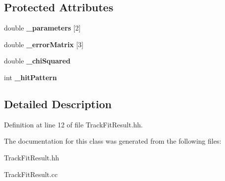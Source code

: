 \subsection*{Protected Attributes}
\begin{DoxyCompactItemize}
\item 
double {\bfseries \-\_\-parameters} [2]\label{classTBTrack_1_1TrackFitResult_ae9b05a73283ac5d325e9bf1a07658854}

\item 
double {\bfseries \-\_\-error\-Matrix} [3]\label{classTBTrack_1_1TrackFitResult_ac56f2127f056edc21a142686304b2acc}

\item 
double {\bfseries \-\_\-chi\-Squared}\label{classTBTrack_1_1TrackFitResult_acdb3c7423e9cb577feb311f30a8f31e7}

\item 
int {\bfseries \-\_\-hit\-Pattern}\label{classTBTrack_1_1TrackFitResult_a585ab993aa74efcb9a0852df862d2be4}

\end{DoxyCompactItemize}


\subsection{Detailed Description}


Definition at line 12 of file Track\-Fit\-Result.\-hh.



The documentation for this class was generated from the following files\-:\begin{DoxyCompactItemize}
\item 
Track\-Fit\-Result.\-hh\item 
Track\-Fit\-Result.\-cc\end{DoxyCompactItemize}
